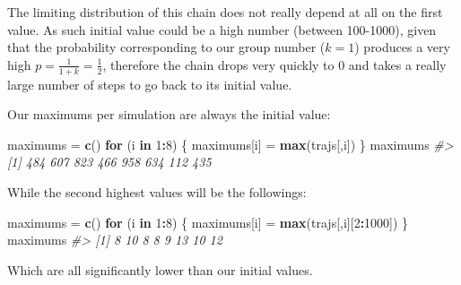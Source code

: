 \documentclass[]{article}
\newenvironment{Shaded}{\begin{snugshade}}{\end{snugshade}}
\newcommand{\CommentTok}[1]{\textcolor[rgb]{0.56,0.35,0.01}{\textit{#1}}}
\newcommand{\ControlFlowTok}[1]{\textcolor[rgb]{0.13,0.29,0.53}{\textbf{#1}}}
\newcommand{\DecValTok}[1]{\textcolor[rgb]{0.00,0.00,0.81}{#1}}
\newcommand{\KeywordTok}[1]{\textcolor[rgb]{0.13,0.29,0.53}{\textbf{#1}}}
\newcommand{\NormalTok}[1]{#1}
\newcommand{\OperatorTok}[1]{\textcolor[rgb]{0.81,0.36,0.00}{\textbf{#1}}}
\newcommand{\StringTok}[1]{\textcolor[rgb]{0.31,0.60,0.02}{#1}}
\begin{document}
The limiting distribution of this chain does not really depend at all on
the first value. As such initial value could be a high number (between
100-1000), given that the probability corresponding to our group number
(\(k=1\)) produces a very high \(p=\frac{1}{1+k} = \frac{1}{2}\),
therefore the chain drops very quickly to 0 and takes a really large
number of steps to go back to its initial value.

Our maximums per simulation are always the initial value:

\begin{Shaded}
\begin{Highlighting}[]
\NormalTok{maximums =}\StringTok{ }\KeywordTok{c}\NormalTok{()}
\ControlFlowTok{for}\NormalTok{ (i }\ControlFlowTok{in} \DecValTok{1}\OperatorTok{:}\DecValTok{8}\NormalTok{) \{}
\NormalTok{    maximums[i] =}\StringTok{ }\KeywordTok{max}\NormalTok{(trajs[,i])}
\NormalTok{\}}
\NormalTok{maximums}
\CommentTok{#> [1] 484 607 823 466 958 634 112 435}
\end{Highlighting}
\end{Shaded}

While the second highest values will be the followings:

\begin{Shaded}
\begin{Highlighting}[]
\NormalTok{maximums =}\StringTok{ }\KeywordTok{c}\NormalTok{()}
\ControlFlowTok{for}\NormalTok{ (i }\ControlFlowTok{in} \DecValTok{1}\OperatorTok{:}\DecValTok{8}\NormalTok{) \{}
\NormalTok{    maximums[i] =}\StringTok{ }\KeywordTok{max}\NormalTok{(trajs[,i][}\DecValTok{2}\OperatorTok{:}\DecValTok{1000}\NormalTok{])}
\NormalTok{\}}
\NormalTok{maximums}
\CommentTok{#> [1]  8 10  8  8  9 13 10 12}
\end{Highlighting}
\end{Shaded}

Which are all significantly lower than our initial values.
\end{document}
